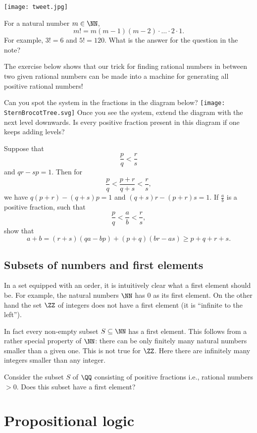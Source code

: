 \documentclass{article}
\begin{document}
\texttt{[image: tweet.jpg]}

For a natural number $m\in \NN$,
$$
m! = m (m-1) (m-2)\cdot \dots \cdot 2\cdot 1. 
$$
For example, $3! = 6$ and $5! = 120$. What is the answer for the
question in the note?
\endshex

The exercise below shows that our trick for finding rational numbers
in between two given rational numbers can be made into a machine for
generating all positive rational numbers!

\beginshex
Can you spot the system in the fractions in the diagram below?
\texttt{[image: SternBrocotTree.svg]}
Once you see the system, extend the diagram with the next level downwards. Is every
positive fraction present in this diagram if one keeps adding levels?

\begin{hint}[showhide]
Suppose that
$$
\frac{p}{q} < \frac{r}{s}
$$
and $q r - s p = 1$. Then for
$$
\frac{p}{q} <  \frac{p+r}{q+s} < \frac{r}{s},
$$
we have $q (p+r) - (q+s) p = 1$ and $(q+s) r - (p + r) s = 1$. If $\frac{a}{b}$ is 
a positive fraction, such that
$$
\frac{p}{q} <  \frac{a}{b} < \frac{r}{s},
$$
show that 
$$
a + b = (r+s)(qa−bp)+(p+q)(br−as)\geq p+q+r+s.
$$
\end{hint}
\endshex


\subsection{Subsets of numbers and first elements}\label{subsecfirst}

In a set equipped with an order, it is intuitively clear what a first element should be. For example,
the natural numbers $\NN$ has $0$ as its first element. On the other hand the set $\ZZ$ of
integers does not have a first element (it is ``infinite to the left'').

In fact every non-empty subset $S\subseteq \NN$ has
a first element. This follows from a rather special property of $\NN$: there
can be only finitely many natural numbers smaller than a given one. This is
not true for $\ZZ$. Here there are infinitely many integers smaller than
any integer.

\beginshex
Consider the subset $S$ of $\QQ$ consisting of positive fractions i.e., rational numbers  $>0$.
Does this subset have a first element?
\endshex




\section{Propositional logic}
\end{document}
